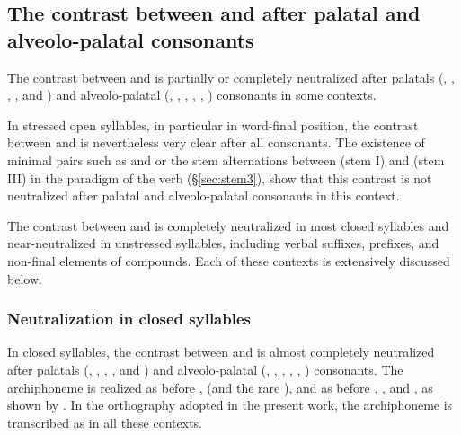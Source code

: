 \subsection{The contrast between  and  after palatal and alveolo-palatal consonants} \label{sec:W.i.contrast}
The contrast between  and  is partially or completely neutralized after palatals (, , , ,  and ) and alveolo-palatal (, , , , , ) consonants in some contexts.

In stressed open syllables, in particular in word-final position, the contrast between  and  is nevertheless very clear after all consonants. The existence of minimal pairs such as  and  or the stem alternations between  (stem I) and  (stem III) in the paradigm of the verb  (§\ref{sec:stem3}), show that this contrast is not neutralized after palatal and alveolo-palatal consonants in this context.

The contrast between  and  is completely neutralized in most closed syllables and near-neutralized in unstressed syllables, including verbal suffixes, prefixes, and non-final elements of compounds. Each of these contexts is extensively discussed below.

\subsubsection{Neutralization in closed syllables} \label{sec:W.i.closed.syllables}
In closed syllables, the contrast between  and  is almost completely neutralized after palatals (, , , ,  and ) and alveolo-palatal (, , , , , ) consonants. The archiphoneme   is realized as  before ,  (and the rare ), and as  before , ,  and , as shown by . In the orthography adopted in the present work, the archiphoneme  is transcribed as  in all these contexts.

